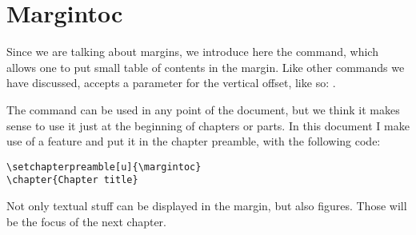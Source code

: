 \section{Margintoc}

Since we are talking about margins, we introduce here the 
 command, which allows one to put small table of 
contents in the margin. Like other commands we have discussed, 
 accepts a parameter for the vertical offset, like 
so: .

The command can be used in any point of the document, but we think it 
makes sense to use it just at the beginning of chapters or parts. In 
this document I make use of a \KOMAScript\xspace feature and put it in 
the chapter preamble, with the following code:


\begin{lstlisting}[style=kaolstplain]
\setchapterpreamble[u]{\margintoc}
\chapter{Chapter title}
\end{lstlisting}

Not only textual stuff can be displayed in the margin, but also figures. 
Those will be the focus of the next chapter.
